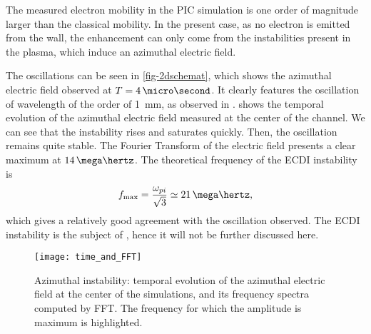   The measured electron mobility in the \ac{PIC} simulation is one order of magnitude larger than the classical mobility.
  In the present case, as no electron is emitted from the wall, the enhancement can only come from the instabilities present in the plasma, which induce an azimuthal electric field.

  The oscillations can be seen in \cref{fig-2dschemat}, which shows the azimuthal electric field observed at $T=4\,\micro\second$.
  It clearly features the oscillation of wavelength of the order of 1~mm, as observed in \citet{heron2013,janhunen2018}.
   shows the temporal evolution of the azimuthal electric field measured at the center of the channel.
  We can see that the instability rises and saturates quickly.
  Then, the oscillation remains quite stable.
  The Fourier Transform of the electric field presents a clear maximum at $14\,\mega\hertz$.
  The theoretical frequency of the \ac{ECDI} instability is \citep{lafleur2017}
  \begin{equation} \label{eq-maxfeq}
    f_{\rm max} = \frac{\omega_{pi}}{\sqrt{3}} \simeq 21 \,\mega\hertz,
  \end{equation}
  which gives a relatively good agreement with the oscillation observed.
  The \ac{ECDI} instability is the subject of , hence it will not be further discussed here.
  
  
  \begin{figure}[hbtp]
    \centering
    \texttt{[image: time\_and\_FFT]}
    \caption{Azimuthal instability\string: temporal evolution of the azimuthal electric field at the center of the simulations, and its frequency spectra computed by \ac{FFT}. The frequency for which the amplitude is maximum is highlighted.}
    \label{fig-exampleECDI}
  \end{figure}
  

  
  